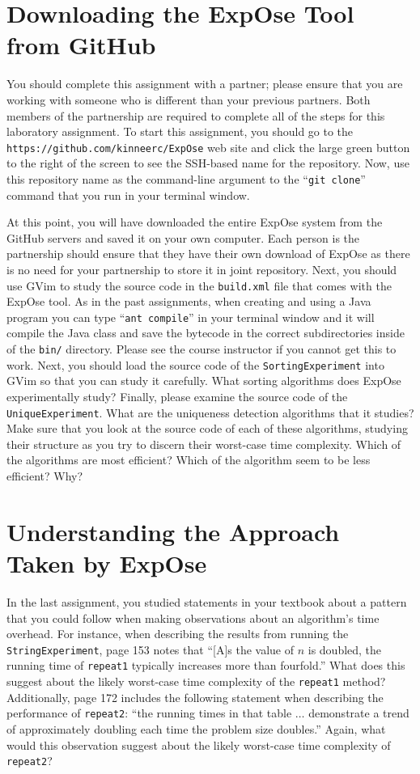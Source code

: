 \section*{Downloading the {\sc ExpOse} Tool from GitHub}

You should complete this assignment with a partner; please ensure that you are working with someone who is different
than your previous partners. Both members of the partnership are required to complete all of the steps for this
laboratory assignment. To start this assignment, you should go to the {\tt https://github.com/kinneerc/ExpOse} web site
and click the large green button to the right of the screen to see the SSH-based name for the repository. Now, use this
repository name as the command-line argument to the ``{\tt git clone}'' command that you run in your terminal window.

At this point, you will have downloaded the entire {\sc ExpOse} system from the GitHub servers and saved it on your own
computer. Each person is the partnership should ensure that they have their own download of {\sc ExpOse} as there is no
need for your partnership to store it in joint repository. Next, you should use GVim to study the source code in the
{\tt build.xml} file that comes with the {\sc ExpOse} tool. As in the past assignments, when creating and using a Java
program you can type ``{\tt ant compile}'' in your terminal window and it will compile the Java class and save the
bytecode in the correct subdirectories inside of the {\tt bin/} directory. Please see the course instructor if you
cannot get this to work. Next, you should load the source code of the {\tt SortingExperiment} into GVim so that you can
study it carefully. What sorting algorithms does {\sc ExpOse} experimentally study? Finally, please examine the
source code of the {\tt UniqueExperiment}. What are the uniqueness detection algorithms that it studies? Make sure that
you look at the source code of each of these algorithms, studying their structure as you try to discern their worst-case
time complexity. Which of the algorithms are most efficient? Which of the algorithm seem to be less efficient? Why?

\section*{Understanding the Approach Taken by {\sc ExpOse}}

In the last assignment, you studied statements in your textbook about a pattern that you could follow when making
observations about an algorithm's time overhead. For instance, when describing the results from running the {\tt
StringExperiment}, page 153 notes that ``[A]s the value of $n$ is doubled, the running time of {\tt repeat1} typically
increases more than fourfold.'' What does this suggest about the likely worst-case time complexity of the {\tt repeat1}
method? Additionally, page 172 includes the following statement when describing the performance of {\tt repeat2}: ``the
running times in that table $\ldots$ demonstrate a trend of approximately doubling each time the problem size doubles.''
Again, what would this observation suggest about the likely worst-case time complexity of {\tt repeat2}?

